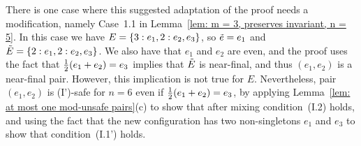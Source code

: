 There is one case where this suggested adaptation of the proof needs a modification,
namely Case~1.1 in Lemma~\ref{lem: m = 3, preserves invariant, n = 5}.
In this case we have $E={ \left\{ 3:e_1, 2:e_2, e_3 \right\} }$, so ${\tilde{e}} = e_1$ and 
${\tilde{E}} = { \left\{ 2:e_1, 2:e_2, e_3 \right\} }$.
We also have that $e_1$ and $e_2$ are even, and
the proof uses the fact that ${\textstyle\frac{1}{2}}(e_1+e_2) = e_3$ implies that ${\tilde{E}}$ is near-final,
and thus $(e_1,e_2)$ is a near-final pair.
However, this implication is not true for $E$.
Nevertheless, pair $(e_1,e_2)$ is (I')-safe for $n=6$ even if ${\textstyle\frac{1}{2}}(e_1+e_2)= e_3$,
by applying Lemma~\ref{lem: at most one mod-unsafe pairs}(c) to show that after mixing
condition~(I.2) holds, and using the fact that the new configuration has two non-singletons $e_1$ and $e_3$
to show that condition~(I.1') holds.


